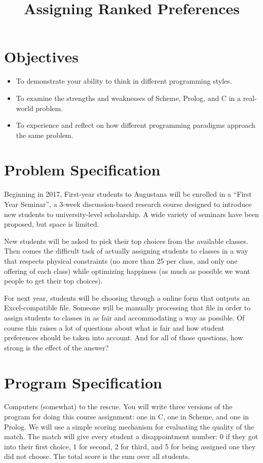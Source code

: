 \documentclass[12pt,info]{asg}
\title{Assigning Ranked Preferences}
\begin{document}
\maketitle
\section*{Objectives}
\begin{itemize}
\item To demonstrate your ability to think in different programming styles.
\item To examine the strengths and weaknesses of Scheme, Prolog, and C in a real-world problem.
\item To experience and reflect on how different programming paradigms approach the same problem.
\end{itemize}

\section*{Problem Specification}
Beginning in 2017, First-year students to Augustana will be enrolled in a ``First Year Seminar'', a 3-week discussion-based research course designed to introduce new students to university-level scholarship. A wide variety of seminars have been proposed, but space is limited.

New students will be asked to pick their top  choices from the available classes. Then comes the difficult task of actually assigning students to classes in a way that respects physical constraints (no more than 25 per class, and only one offering of each class) while optimizing happiness (as much as possible we want people to get their top choices).

For next year, students will be choosing through a online form that outputs an Excel-compatible file. Someone will be manually processing that file in order to assign students to classes in as fair and accommodating a way as possible. Of course this raises a lot of questions about what is fair and how student preferences should be taken into account. And for all of those questions, how strong is the effect of the answer? 

\section*{Program Specification}
Computers (somewhat) to the rescue. You will write three versions of the program for doing this course assignment: one in C, one in Scheme, and one in Prolog. We will use a simple scoring mechanism for evaluating the quality of the match. The match will give every student a disappointment number: 0 if they got into their first choice, 1 for second, 2 for third, and 5 for being assigned one they did not choose. The total score is the sum over all students. 
\end{document}
